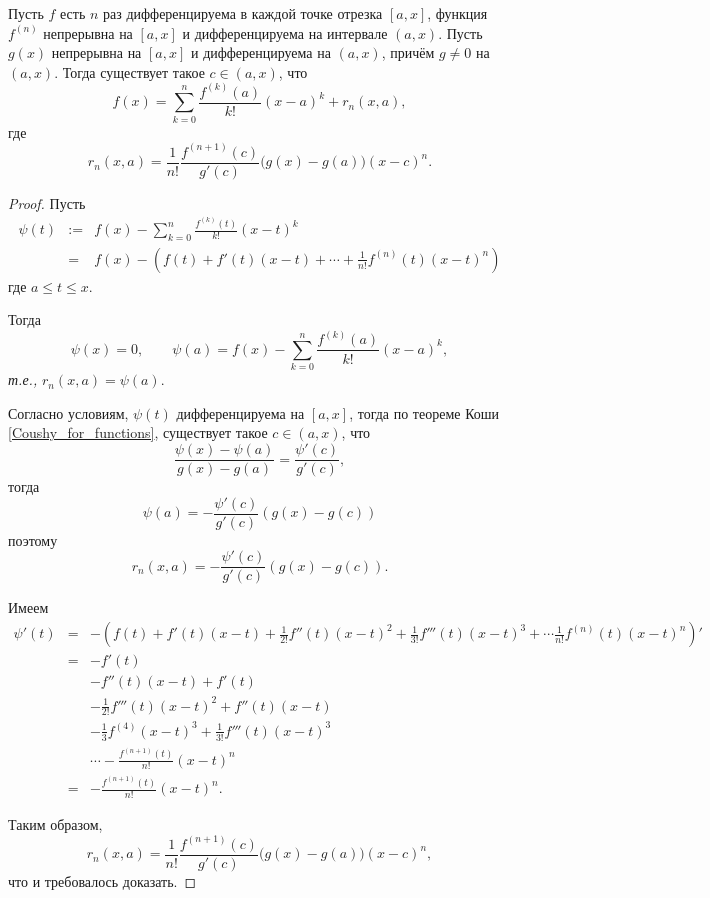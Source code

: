 \begin{theorem}\label{gen_monom}
    Пусть $f$ есть $n$ раз дифференцируема в каждой точке отрезка $[a,x]$, функция $f^{(n)}$ непрерывна на $[a,x]$ и дифференцируема на интервале $(a,x)$. Пусть $g(x)$ непрерывна на $[a,x]$ и дифференцируема на $(a,x)$, причём $g\ne 0$ на $(a,x)$. Тогда существует такое $c\in (a,x)$, что
    \[
     f(x) = \sum_{k=0}^n \frac{f^{(k)}(a)}{k!}(x-a)^k + r_n(x,a),
    \]
    где 
    \[
     r_n(x,a) = \frac{1}{n!}\frac{f^{(n+1)}(c)}{g'(c)}\bigl(g(x) - g(a)\bigr)(x-c)^n.
    \]
\end{theorem}
\begin{proof}
Пусть
\begin{eqnarray*}
  \psi(t) &:=& f(x) - \sum_{k=0}^n \frac{f^{(k)}(t)}{k!}(x-t)^k \\
  &=& f(x) - \left(f(t) + f'(t)(x-t) + \cdots + \frac{1}{n!}f^{(n)}(t)(x-t)^n \right) 
\end{eqnarray*}
где $a \le t \le x$.

Тогда
\[
 \psi(x) = 0, \qquad \psi(a) = f(x) - \sum_{k=0}^n \frac{f^{(k)}(a)}{k!}(x-a)^k,
\]
\textit{т.е.,} $r_n(x,a) = \psi(a)$.

Согласно условиям, $\psi(t)$ дифференцируема на $[a,x]$, тогда по теореме Коши \ref{Coushy_for_functions}, существует такое $c \in (a,x)$, что
\[
 \frac{\psi(x)-\psi(a)}{g(x) - g(a)} = \frac{\psi'(c)}{g'(c)},
\]
тогда
\[
 \psi(a) = - \frac{\psi'(c)}{g'(c)}(g(x) - g(c))
\]
поэтому
\[
 r_n(x,a)= - \frac{\psi'(c)}{g'(c)}(g(x) - g(c)).
\]

Имеем
\begin{eqnarray*}
    \psi'(t) &= & - \left( f(t) + f'(t)(x-t) + \frac{1}{2!}f''(t)(x-t)^2 + \frac{1}{3!}f'''(t)(x-t)^3 + \cdots \frac{1}{n!}f^{(n)}(t) (x-t)^n \right)' \\
    &=& -f'(t) \\
    && - f''(t)(x-t) + f'(t) \\
    && - \frac{1}{2!}f'''(t)(x-t)^2 + f''(t)(x-t) \\
    &&  - \frac{1}{3}f^{(4)}(x-t)^3 + \frac{1}{3!}f'''(t)(x-t)^3 \\
    && \cdots - \frac{f^{(n+1)}(t)}{n!}(x-t)^n \\
    &=& - \frac{f^{(n+1)}(t)}{n!}(x-t)^n.
\end{eqnarray*}

Таким образом,
\[
 r_n(x,a) =\frac{1}{n!}\frac{f^{(n+1)}(c)}{g'(c)}\bigl(g(x) - g(a)\bigr)(x-c)^n,
\]
что и требовалось доказать.    
\end{proof}


